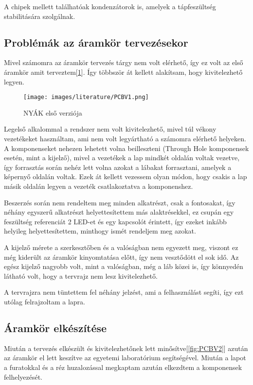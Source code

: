 A chipek mellett találhatóak kondenzátorok is, amelyek a tápfeszültség stabilitására
szolgálnak.

\subsection{Problémák az áramkör tervezésekor}

Mivel számomra az áramkör tervezés tárgy nem volt elérhető, így ez volt az első 
áramkör amit terveztem[\ref{fig:PCBV1}]. Így többször át kellett alakítsam, hogy kivitelezhető legyen.

\begin{figure}[h]
    \centering
    \texttt{[image: images/literature/PCBV1.png]}
    \caption{NYÁK első verziója}
    \label{fig:PCBV1}
\end{figure}

Legelső alkalommal a rendszer nem volt kivitelezhető, mivel túl vékony vezetékeket
használtam, ami nem volt legyártható a számomra elérhető helyeken. A komponenseket 
nehezen lehetett volna beilleszteni (Through Hole komponensek esetén, mint a kijelző),
mivel a vezetékek a lap mindkét oldalán voltak vezetve, így forrasztás során nehéz
lett volna azokat a lábakat forrasztani, amelyek a képernyő oldalán voltak.
Ezek át kellett vezessem olyan módon, hogy csakis a lap másik oldalán legyen a vezeték
csatlakoztatva a komponenshez.

Beszerzés során nem rendeltem meg minden alkatrészt, csak a fontosakat, így néhány
egyszerű alkatrészt helyettesítettem más alaktrésekkel, ez csupán egy feszültség referenciát
2 LED-et és egy kapcsolót érintett, így ezeket inkább helyileg helyettesítettem, minthogy
ismét rendeljem meg azokat.

A kijelző mérete a szerkesztőben és a valóságban nem egyezett meg, viszont ez még 
kiderült az áramkör kinyomtatása előtt, így nem vesztődött el sok idő. Az egész
kijelző nagyobb volt, mint a valóságban, még a láb közei is, így könnyedén látható
volt, hogy a tervrajz nem lesz kivitelezhető.

A tervrajzra nem tüntettem fel néhány jelzést, ami a felhasználást segíti, így ezt 
utólag felrajzoltam a lapra.

\subsection{Áramkör elkészítése}

Miután a tervezés elkészült és kivitelezhetőnek lett minősítve[\ref{fig:PCBV2}] azután az áramkör
el lett keszítve az egyetemi laboratórium segítségével. Miután a lapot a furatokkal és a réz
huzalozással megkaptam azután elkezdtem a komponensek felhelyezését.

